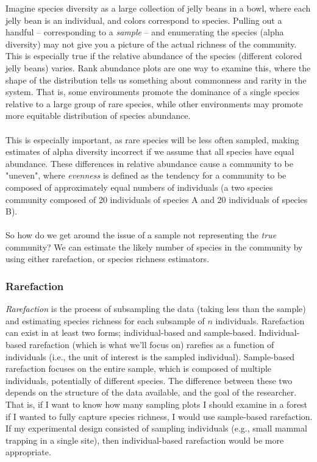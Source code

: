 \documentclass[12pt]{article}
\begin{document}
Imagine species diversity as a large collection of jelly beans in a bowl, where each jelly bean is an individual, and colors correspond to species. Pulling out a handful -- corresponding to a \textit{sample} -- and enumerating the species (alpha diversity) may not give you a picture of the actual richness of the community. This is especially true if the relative abundance of the species (different colored jelly beans) varies. Rank abundance plots are one way to examine this, where the shape of the distribution tells us something about commonness and rarity in the system. That is, some environments promote the dominance of a single species relative to a large group of rare species, while other environments may promote more equitable distribution of species abundance. 


\paragraph*{}
This is especially important, as rare species will be less often sampled, making estimates of alpha diversity incorrect if we assume that all species have equal abundance. These differences in relative abundance cause a community to be "uneven", where \textit{evenness} is defined as the tendency for a community to be composed of approximately equal numbers of individuals (a two species community composed of 20 individuals of species A and 20 individuals of species B). 


\paragraph*{}
So how do we get around the issue of a sample not representing the \textit{true} community? We can estimate the likely number of species in the community by using either rarefaction, or species richness estimators. 






\subsubsection*{Rarefaction}

\textit{Rarefaction} is the process of subsampling the data (taking less than the sample) and estimating species richness for each subsample of $n$ individuals. Rarefaction can exist in at least two forms; individual-based and sample-based. Individual-based rarefaction (which is what we'll focus on) rarefies as a function of individuals (i.e., the unit of interest is the sampled individual). Sample-based rarefaction focuses on the entire sample, which is composed of multiple individuals, potentially of different species. The difference between these two depends on the structure of the data available, and the goal of the researcher. That is, if I want to know how many sampling plots I should examine in a forest if I wanted to fully capture species richness, I would use sample-based rarefaction. If my experimental design consisted of sampling individuals (e.g., small mammal trapping in a single site), then individual-based rarefaction would be more appropriate. 
\end{document}
